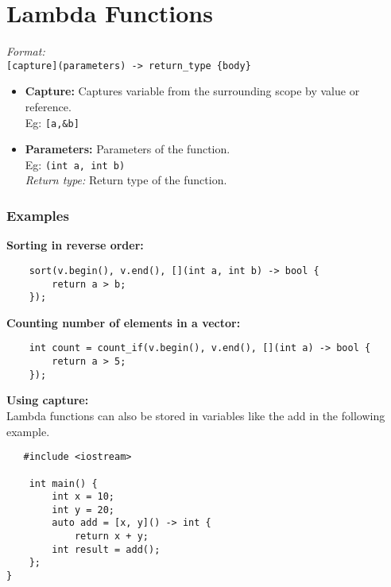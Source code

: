 \section{Lambda Functions}

\textit{Format:}\\
\texttt{[capture](parameters) -> return\_type \{body\}}\\

\begin{itemize}
    \item \textbf{Capture:} Captures variable from the surrounding scope by value or reference.\\
        Eg: \texttt{[a,\&b]}\\
    \item \textbf{Parameters:} Parameters of the function.\\
        Eg: \texttt{(int a, int b)}\\
\textit{Return type:} Return type of the function.\\
\end{itemize}

\subsubsection{Examples}
\textbf{Sorting in reverse order:}
\begin{verbatim}
    sort(v.begin(), v.end(), [](int a, int b) -> bool {
        return a > b;
    });
\end{verbatim} 

\textbf{Counting number of elements in a vector:}
\begin{verbatim}
    int count = count_if(v.begin(), v.end(), [](int a) -> bool {
        return a > 5;
    });
\end{verbatim}

\vfill\null
\columnbreak

\textbf{Using capture:}\\
Lambda functions can also be stored in variables like the add in the following example.\\
\begin{verbatim}
   #include <iostream>

    int main() {
        int x = 10;
        int y = 20;
        auto add = [x, y]() -> int {
            return x + y;
        int result = add();
    };
}
 
\end{verbatim}